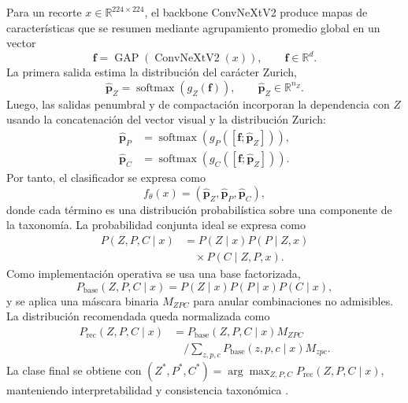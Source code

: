 \documentclass[a4paper,twocolumn,11pt]{article}
\begin{document}
Para un recorte $x\in\mathbb{R}^{224\times224}$, el backbone ConvNeXtV2 produce mapas de características que se resumen mediante agrupamiento promedio global en un vector
\begin{equation}
\mathbf{f}=\operatorname{GAP}(\operatorname{ConvNeXtV2}(x)), \qquad \mathbf{f}\in\mathbb{R}^{d}.
\end{equation}
La primera salida estima la distribución del carácter Zurich,
\begin{equation}
\hat{\mathbf{p}}_Z=\operatorname{softmax}(g_Z(\mathbf{f})), \qquad \hat{\mathbf{p}}_Z\in\mathbb{R}^{n_Z}.
\end{equation}
Luego, las salidas penumbral y de compactación incorporan la dependencia con $Z$ usando la concatenación del vector visual y la distribución Zurich:
\begin{equation}
\begin{aligned}
\hat{\mathbf{p}}_P&=\operatorname{softmax}(g_P([\mathbf{f};\hat{\mathbf{p}}_Z])),\\
\hat{\mathbf{p}}_C&=\operatorname{softmax}(g_C([\mathbf{f};\hat{\mathbf{p}}_Z])).
\end{aligned}
\end{equation}
Por tanto, el clasificador se expresa como
\begin{equation}
f_\theta(x)=\left(\hat{\mathbf{p}}_Z,\hat{\mathbf{p}}_P,\hat{\mathbf{p}}_C\right),
\end{equation}
donde cada término es una distribución probabilística sobre una componente de la taxonomía. La probabilidad conjunta ideal se expresa como
\begin{equation}
\begin{aligned}
P(Z,P,C\mid x)&=P(Z\mid x)P(P\mid Z,x)\\
&\quad \times P(C\mid Z,P,x).
\end{aligned}
\end{equation}
Como implementación operativa se usa una base factorizada,
\begin{equation}
P_{\mathrm{base}}(Z,P,C\mid x)=P(Z\mid x)P(P\mid x)P(C\mid x),
\end{equation}
y se aplica una máscara binaria $M_{ZPC}$ para anular combinaciones no admisibles. La distribución recomendada queda normalizada como
\begin{equation}
\begin{aligned}
P_{\mathrm{rec}}(Z,P,C\mid x)&=
P_{\mathrm{base}}(Z,P,C\mid x)M_{ZPC}\\
&\quad \Big/ \sum_{z,p,c}P_{\mathrm{base}}(z,p,c\mid x)M_{zpc}.
\end{aligned}
\end{equation}
La clase final se obtiene con $(Z^\ast,P^\ast,C^\ast)=\arg\max_{Z,P,C}P_{\mathrm{rec}}(Z,P,C\mid x)$, manteniendo interpretabilidad y consistencia taxonómica \citep{mcintosh1990classification,bornmann1994flarerates,cui2019classbalanced,sayez2023sunscc}.
\end{document}
